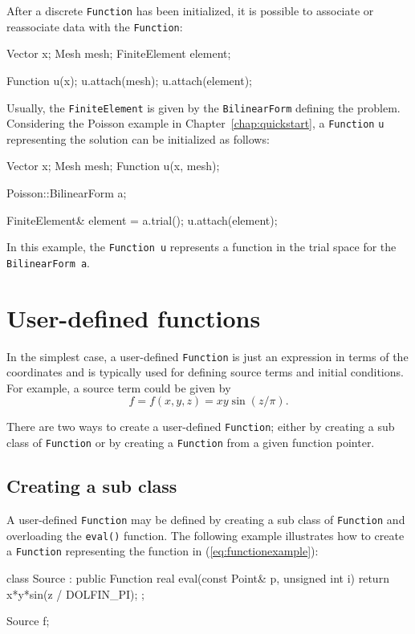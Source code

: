 After a discrete \texttt{Function} has been initialized, it is
possible to associate or reassociate data with the \texttt{Function}:
\begin{code}
Vector x;
Mesh mesh;
FiniteElement element;

Function u(x);
u.attach(mesh);
u.attach(element);
\end{code}

Usually, the \texttt{FiniteElement} is given by the
\texttt{BilinearForm} defining the problem. Considering the Poisson
example in Chapter~\ref{chap:quickstart}, a \texttt{Function}
\texttt{u} representing the solution can be initialized as follows:
\begin{code}
Vector x;
Mesh mesh;
Function u(x, mesh);

Poisson::BilinearForm a;

FiniteElement& element = a.trial();
u.attach(element); 
\end{code}
In this example, the \texttt{Function}~\texttt{u} represents a
function in the trial space for the \texttt{BilinearForm}~\texttt{a}.

\section{User-defined functions}

In the simplest case, a user-defined \texttt{Function} is just an
expression in terms of the coordinates and is typically used for
defining source terms and initial conditions. For example, a source
term could be given by
\begin{equation} \label{eq:functionexample}
  f = f(x, y, z) = xy \sin(z / \pi).
\end{equation}

There are two ways to create a user-defined \texttt{Function}; either
by creating a sub class of \texttt{Function} or by creating a
\texttt{Function} from a given function pointer.

\subsection{Creating a sub class}

A user-defined \texttt{Function} may be defined by creating a sub
class of \texttt{Function} and overloading the \texttt{eval()}
function.  The following example illustrates how to create a
\texttt{Function} representing the function in
(\ref{eq:functionexample}):
\begin{code}
class Source : public Function
{
  real eval(const Point& p, unsigned int i)
  {
    return x*y*sin(z / DOLFIN_PI);
  }
};

Source f;
\end{code}

